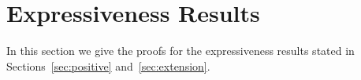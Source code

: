 \section{Expressiveness Results}

In this section we give the proofs for the expressiveness
results stated in Sections~\ref{sec:positive} and~\ref{sec:extension}.

%
%
%				
%
%
%


